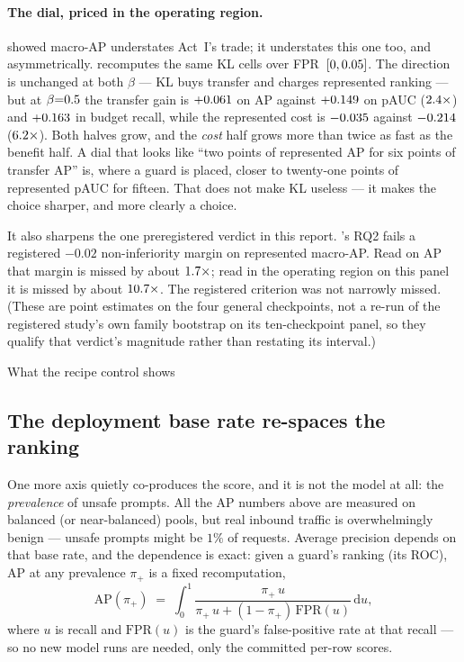 \paragraph{The dial, priced in the operating region.}  showed macro-AP
understates Act~I's trade; it understates this one too, and asymmetrically.
 recomputes the same KL cells over FPR~$[0,0.05]$. The direction is
unchanged at both $\beta$ --- KL buys transfer and charges represented ranking --- but at
$\beta{=}0.5$ the transfer gain is $+0.061$ on AP against
$+0.149$ on pAUC ($2.4\times$) and
$+0.163$ in budget recall, while the represented cost is $-0.035$
against $-0.214$ ($6.2\times$). Both halves grow, and the
\emph{cost} half grows more than twice as fast as the benefit half. A dial that looks like
``two points of represented AP for six points of transfer AP'' is, where a guard is placed, closer
to twenty-one points of represented pAUC for fifteen. That does not make KL useless --- it makes the
choice sharper, and more clearly a choice.



\noindent It also sharpens the one preregistered verdict in this report. 's RQ2
fails a registered $-0.02$ non-inferiority margin on represented macro-AP. Read on AP that margin is
missed by about $1.7\times$; read in the operating region on this panel it is
missed by about $10.7\times$. The registered criterion was not narrowly
missed. (These are point estimates on the four general checkpoints, not a re-run of the registered
study's own family bootstrap on its ten-checkpoint panel, so they qualify that verdict's magnitude
rather than restating its interval.)

\begin{takeaway}{What the recipe control shows}
\KLTakeaway
\end{takeaway}

\subsection{The deployment base rate re-spaces the ranking}
\label{sec:actI-prevalence}

One more axis quietly co-produces the score, and it is not the model at all: the \emph{prevalence} of
unsafe prompts. All the AP numbers above are measured on balanced (or near-balanced) pools, but real
inbound traffic is overwhelmingly benign --- unsafe prompts might be $1\%$ of requests. Average precision
depends on that base rate, and the dependence is exact: given a guard's ranking (its ROC), AP at any
prevalence $\pi_+$ is a fixed recomputation,
\begin{equation}
\mathrm{AP}(\pi_+) \;=\; \int_0^1 \frac{\pi_+\,u}{\pi_+\,u + (1-\pi_+)\,\mathrm{FPR}(u)}\,\mathrm{d}u,
\label{eq:ap-prevalence}
\end{equation}
where $u$ is recall and $\mathrm{FPR}(u)$ is the guard's false-positive rate at that recall --- so no new
model runs are needed, only the committed per-row scores.

